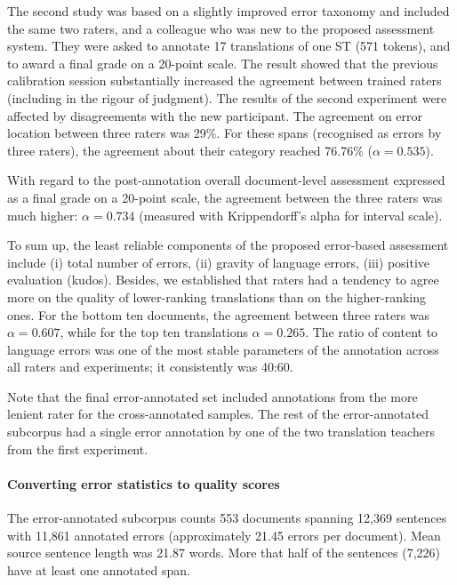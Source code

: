 The second study was based on a slightly improved error taxonomy and included the same two raters, and a colleague who was new to the proposed assessment system. They were asked to annotate 17 translations of one ST (571 tokens), and to award a final grade on a 20-point scale. The result showed that the previous calibration session substantially increased the agreement between trained raters (including in the rigour of judgment). The results of the second experiment were affected by disagreements with the new participant. The agreement on error location between three raters was 29\%. For these spans (recognised as errors by three raters), the agreement about their category reached 76.76\% ($\alpha=0.535$).

With regard to the post-annotation overall document-level assessment expressed as a final grade on a 20-point scale, the agreement between the three raters was much higher: $\alpha=0.734$ (measured with Krippendorff's alpha for interval scale).

To sum up, the least reliable components of the proposed error-based assessment include (i) total number of errors, (ii) gravity of language errors, (iii) positive evaluation (kudos).
Besides, we established that raters had a tendency to agree more on the quality of lower-ranking translations than on the higher-ranking ones. For the bottom ten documents, the agreement between three raters was $\alpha=0.607$, while for the top ten translations $\alpha=0.265$. 
The ratio of content to language errors was one of the most stable parameters of the annotation across all raters and experiments; it consistently was 40:60.

Note that the final error-annotated set included annotations from the more lenient rater for the cross-annotated samples. The rest of the error-annotated subcorpus had a single error annotation by one of the two translation teachers from the first experiment.

\paragraph{\label{pg:err-score-generation}Converting error statistics to quality scores}
The error-annotated subcorpus counts 553 documents spanning 12,369 sentences with 11,861 annotated errors (approximately 21.45 errors per document). Mean source sentence length was 21.87 words. 
More that half of the sentences (7,226) have at least one annotated span.


